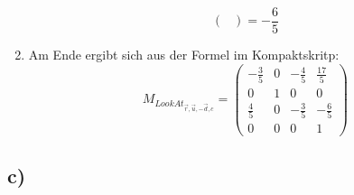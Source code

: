 \documentclass{article}
\begin{document}
\begin{enumerate}
\[\begin{pmatrix}
    \end{pmatrix}
    =-\frac{6}{5}
    \]
    \item 
    Am Ende ergibt sich aus der Formel im Kompaktskritp:
    \[
    M_{LookAt_{\overrightarrow{r},\overrightarrow{u},-\overrightarrow{d},c}}=
    \begin{pmatrix}
    -\frac{3}{5}&0&-\frac{4}{5}&\frac{17}{5}\\
    0&1&0&0\\
    \frac{4}{5}&0&-\frac{3}{5}&-\frac{6}{5}\\
    0&0&0&1
    \end{pmatrix}
    \]
\end{enumerate}

\subsection*{c)}
\end{document}
